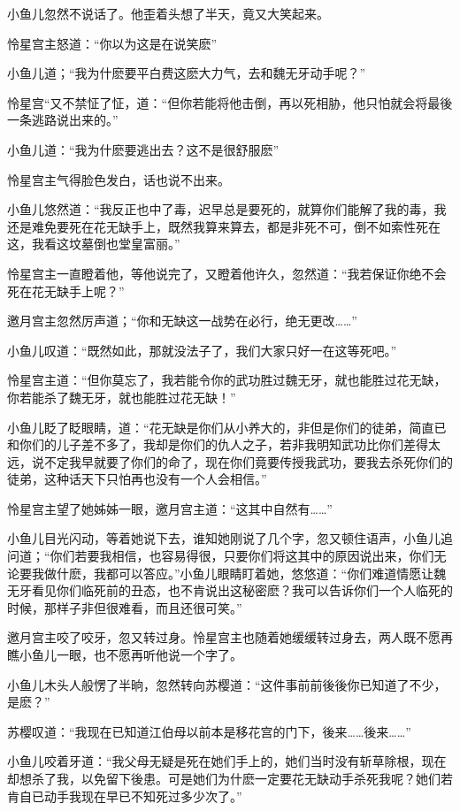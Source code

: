 \documentclass[12pt,oneside]{book}
\begin{document}
小鱼儿忽然不说话了。他歪着头想了半天，竟又大笑起来。

怜星宫主怒道：``你以为这是在说笑麽''

小鱼儿道；``我为什麽要平白费这麽大力气，去和魏无牙动手呢？''

怜星宫``又不禁怔了怔，道：``但你若能将他击倒，再以死相胁，他只怕就会将最後一条逃路说出来的。''

小鱼儿道：``我为什麽要逃出去？这不是很舒服麽''

怜星宫主气得脸色发白，话也说不出来。

小鱼儿悠然道：``我反正也中了毒，迟早总是要死的，就算你们能解了我的毒，我还是难免要死在花无缺手上，既然我算来算去，都是非死不可，倒不如索性死在这，我看这坟墓倒也堂皇富丽。''

怜星宫主一直瞪着他，等他说完了，又瞪着他许久，忽然道：``我若保证你绝不会死在花无缺手上呢？''

邀月宫主忽然厉声道；``你和无缺这一战势在必行，绝无更改\ldots\ldots{}''

小鱼儿叹道：``既然如此，那就没法子了，我们大家只好一在这等死吧。''

怜星宫主道：``但你莫忘了，我若能令你的武功胜过魏无牙，就也能胜过花无缺，你若能杀了魏无牙，就也能胜过花无缺！''

小鱼儿眨了眨眼睛，道：``花无缺是你们从小养大的，非但是你们的徒弟，简直已和你们的儿子差不多了，我却是你们的仇人之子，若非我明知武功比你们差得太远，说不定我早就要了你们的命了，现在你们竟要传授我武功，要我去杀死你们的徒弟，这种话天下只怕再也没有一个人会相信。''

怜星宫主望了她姊姊一眼，邀月宫主道：``这其中自然有\ldots\ldots{}''

小鱼儿目光闪动，等着她说下去，谁知她刚说了几个字，忽又顿住语声，小鱼儿追问道；``你们若要我相信，也容易得很，只要你们将这其中的原因说出来，你们无论要我做什麽，我都可以答应。''小鱼儿眼睛盯着她，悠悠道：``你们难道情愿让魏无牙看见你们临死前的丑态，也不肯说出这秘密麽？我可以告诉你们一个人临死的时候，那样子非但很难看，而且还很可笑。''

邀月宫主咬了咬牙，忽又转过身。怜星宫主也随着她缓缓转过身去，两人既不愿再瞧小鱼儿一眼，也不愿再听他说一个字了。

小鱼儿木头人般愣了半晌，忽然转向苏樱道：``这件事前前後後你已知道了不少，是麽？''

苏樱叹道：``我现在已知道江伯母以前本是移花宫的门下，後来\ldots\ldots 後来\ldots\ldots{}''

小鱼儿咬着牙道：``我父母无疑是死在她们手上的，她们当时没有斩草除根，现在却想杀了我，以免留下後患。可是她们为什麽一定要花无缺动手杀死我呢？她们若肯自已动手我现在早已不知死过多少次了。''
\end{document}
